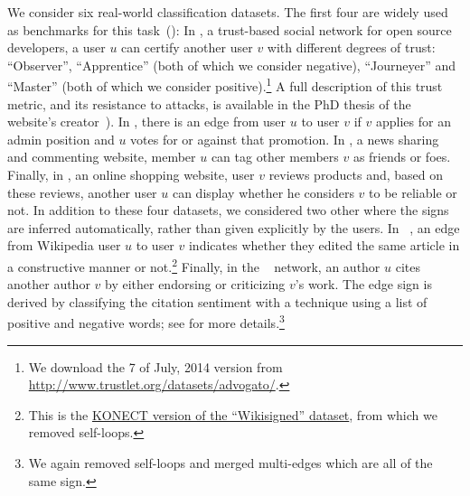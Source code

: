 We consider six real-world classification datasets. The first four are \dssn{} widely
used as benchmarks for this
task~(\eg{}\autocites{Leskovec2010}{shahriari2014ranking}{wu2016troll}{OnlineCompletion17}):
In \adv{}, a trust-based social network for open source developers, a user $u$ can certify another
user $v$ with different degrees of trust: \enquote{Observer}, \enquote{Apprentice} (both of which we
consider negative), \enquote{Journeyer} and \enquote{Master} (both of which we consider
positive).\footnote{We download the 7\thup{} of July, 2014 version from
\url{http://www.trustlet.org/datasets/advogato/}.} A full description of this trust metric, and its
resistance to attacks, is available in the PhD thesis of the website's creator~\autocite[Section
4]{AdvogatoTrustThesis02}).
In \wik{}, there is an edge from user $u$ to user $v$ if $v$ applies for an admin position and $u$
votes for or against that promotion. In \sla{}, a news sharing and commenting website, member $u$
can tag other members $v$ as friends or foes. Finally, in \epi{}, an online shopping website, user
$v$ reviews products and, based on these reviews, another user $u$ can display whether he considers
$v$ to be reliable or not. In addition to these four datasets, we considered two other \ssn{} where
the signs are inferred automatically, rather than given explicitly by the users.  In
\kiw{}~\cite{wikiedits11}, an edge from Wikipedia user $u$ to user $v$ indicates whether they edited
the same article in a constructive manner or not.\footnote{This is the
\href{http://konect.uni-koblenz.de/networks/wikisigned-k2}{KONECT version of the
\enquote{Wikisigned} dataset}, from which we removed self-loops.} Finally, in the
\aut{}~\cite{kumar2016structure} network, an author $u$ cites another author $v$ by either endorsing
or criticizing $v$'s work. The edge sign is derived by classifying the citation sentiment with a
technique using a list of positive and negative words; see
\cite{kumar2016structure} for more details.\footnote{We again removed self-loops and merged
multi-edges which are all of the same sign.}

